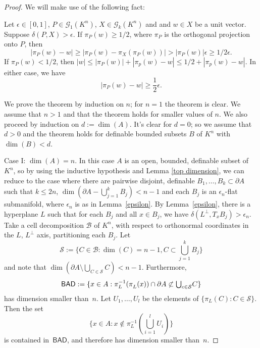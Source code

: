 \documentclass[a4paper, 12pt, final]{article}
\newtheorem{open problem}[lem]{Open problem}
\theoremstyle{remark}
\theoremstyle{definition}
\newtheorem{final remark}[lem]{Final remark}
\begin{document}
\begin{proof} We will make use of the following fact:

Let $\epsilon\in[0,1]$, $P\in \mathcal G_1({K}^n)$, $X\in \mathcal G_k({K}^n)$ and and $w\in X$ be a unit vector. Suppose $\delta(P,X)>\epsilon$. If $\pi_P(w)\geq 1/2$, where $\pi_P$ is the orthogonal projection onto $P$, then 
\begin{equation*}
|\pi_P(w)-w|\geq|\pi_P(w)-\pi_X(\pi_P(w))|>|\pi_P(w)|\epsilon\geq1/2\epsilon.
\end{equation*}
 If $\pi_P(w)<1/2$, then $|w|\leq|\pi_P(w)|+|\pi_p(w)-w|\leq1/2+|\pi_p(w)-w|$. In either case, we have  
\begin{equation}\label{delta(P,X)}
|\pi_P(w)-w|\geq\frac{1}{2}\epsilon.
\end{equation}

We prove the theorem by induction on $n$; for $n=1$ the theorem is clear. 
We assume  that $n>1$ and that the theorem holds for smaller values of $n$. We also proceed by induction on $d:=\dim(A)$. It's clear for $d=0$; so we assume that $d>0$ 
and the theorem holds for definable bounded subsets $B$ of ${K}^{n}$ with $\dim(B)< d$.

Case I: $\dim(A)=n$. In this case $A$ is an open, bounded, definable subset of ${K}^n$, so by using the inductive hypothesis and Lemma \ref{top dimension}, we can reduce to the case where there are pairwise disjoint, definable $B_1,\dots,B_k\subset\partial A$ such that $k\leq 2n$, $\dim(\partial A-{\textstyle\bigcup}_{j=1}^k B_j)<n-1$ and each $B_j$ is an $\epsilon_n$-flat submanifold, where $\epsilon_n$ is as in Lemma~\ref{epsilon}. By Lemma~\ref{epsilon}, there is  a hyperplane $L$ such that for each $B_j$ and all $x\in B_j$, we have $\delta(L^{\perp},T_xB_j)>\epsilon_n$. Take a cell decomposition $\mathcal B$ of ${K}^n$, with respect to orthonormal coordinates in the $L$, $L^\perp$ axis, partitioning each $B_j$. Let 
\[
\mathcal S:=\{C\in\mathcal B:\dim(C)=n-1, C\subset{\textstyle\bigcup}_{j=1}^k B_j\}
\]
and note that $\dim(\partial A\setminus{\textstyle\bigcup}_{C \in \mathcal S}C)<n-1$. Furthermore, 
\[
{\mathsf{BAD}} := \{x\in A:\pi_L^{-1}(\pi^{\mathstrut}_L(x)) \cap \partial A \not \subset 
{\textstyle\bigcup}_{c \in \mathcal S} C\}
\]                                
has dimension smaller than~$n$. 
Let $U_1,\dots,U_l$ be the elements of $\{\pi_L(C):C\in\mathcal S\}$. Then the set 
\[
\{x\in A:x\not\in\pi_L^{-1}({\textstyle\bigcup}_{i=1}^l U_i)\}
\]
is contained in~${\mathsf{BAD}}$, and therefore has dimension smaller than~$n$. 


\end{proof}
\end{document}
